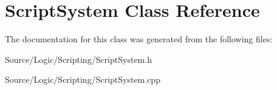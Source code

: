 \hypertarget{class_script_system}{}\section{Script\+System Class Reference}
\label{class_script_system}


The documentation for this class was generated from the following files\+:\begin{DoxyCompactItemize}
\item 
Source/\+Logic/\+Scripting/Script\+System.\+h\item 
Source/\+Logic/\+Scripting/Script\+System.\+cpp\end{DoxyCompactItemize}
